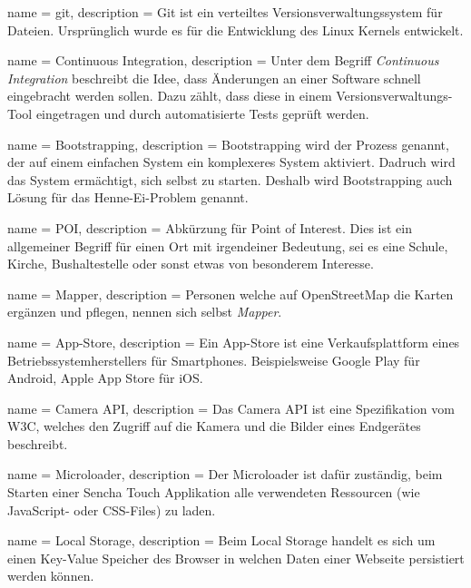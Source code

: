  {
	name = git,
	description = {Git ist ein verteiltes Versionsverwaltungssystem für Dateien. Ursprünglich wurde es für die Entwicklung des Linux Kernels entwickelt.}
}

 {
	name = Continuous Integration,
	description = {Unter dem Begriff \emph{Continuous Integration}\cite{cont-integration} beschreibt die Idee, dass Änderungen an einer Software schnell eingebracht werden sollen. Dazu zählt, dass diese in einem Versionsverwaltungs-Tool eingetragen und durch automatisierte Tests geprüft werden.}
}

 {
	name = Bootstrapping,
	description = {Bootstrapping wird der Prozess genannt, der auf einem einfachen System ein komplexeres System aktiviert\cite{bootstrapping}. Dadruch wird das System ermächtigt, sich selbst zu starten. Deshalb wird Bootstrapping auch Lösung für das Henne-Ei-Problem genannt.}
}

 {
	name = POI,
	description = {Abkürzung für Point of Interest. Dies ist ein allgemeiner Begriff für einen Ort mit irgendeiner Bedeutung, sei es eine Schule, Kirche, Bushaltestelle oder sonst etwas von besonderem Interesse.}
}

 {
	name = Mapper,
	description = {Personen welche auf OpenStreetMap die Karten ergänzen und pflegen, nennen sich selbst \emph{Mapper}.}
}

 {
	name = App-Store,
	description = {Ein App-Store ist eine Verkaufsplattform eines Betriebssystemherstellers für Smartphones. Beispielsweise Google Play für Android, Apple App Store für iOS.}
}

 {
	name = Camera API,
	description = {Das Camera API ist eine Spezifikation vom W3C\cite{camera-api}, welches den Zugriff auf die Kamera und die Bilder eines Endgerätes beschreibt.}
}

 {
	name = Microloader,
	description = {Der Microloader ist dafür zuständig, beim Starten einer Sencha Touch Applikation alle verwendeten Ressourcen (wie JavaScript- oder CSS-Files) zu laden.}
}

 {
	name = Local Storage,
	description = {Beim Local Storage handelt es sich um einen Key-Value Speicher des Browser in welchen Daten einer Webseite persistiert werden können.}
}